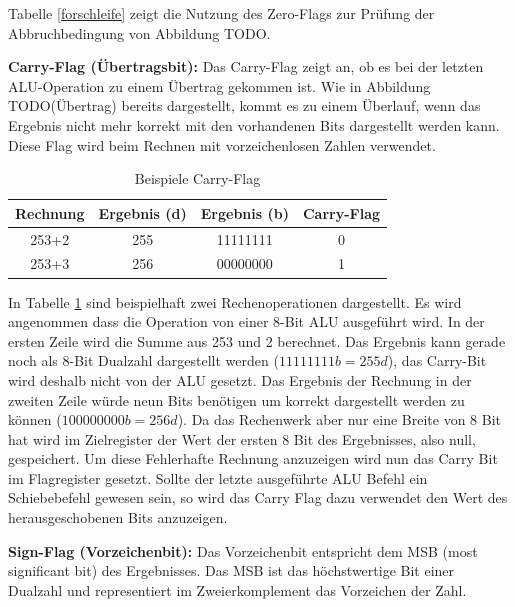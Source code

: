 \documentclass[12pt]{article}
\begin{document}
Tabelle \ref{forschleife} zeigt die Nutzung des Zero-Flags zur Prüfung der Abbruchbedingung von Abbildung TODO.


\noindent \textbf{Carry-Flag (Übertragsbit):} Das Carry-Flag zeigt an, ob es bei der letzten ALU-Operation zu einem Übertrag gekommen ist. Wie in Abbildung TODO(Übertrag) bereits dargestellt, kommt es zu einem Überlauf, wenn das Ergebnis nicht mehr korrekt mit den vorhandenen Bits dargestellt werden kann. Diese Flag wird beim Rechnen mit vorzeichenlosen Zahlen verwendet.

\begin{table}[!htb]
\centering
\begin{tabular}{|c|c|c|c|}
\hline
Rechnung & Ergebnis (d) & Ergebnis (b) & Carry-Flag \\ \hline \hline
253+2    & 255          & 11111111     & 0          \\ \hline \hline
253+3    & 256          & 00000000     & 1          \\ \hline
\end{tabular}
\caption{Beispiele Carry-Flag}
\label{tab:carry}

\end{table}
In Tabelle \ref{tab:carry} sind beispielhaft zwei Rechenoperationen dargestellt. Es wird angenommen dass die Operation von einer 8-Bit ALU ausgeführt wird. In der ersten Zeile wird die Summe aus 253 und 2 berechnet. Das Ergebnis kann gerade noch als 8-Bit Dualzahl dargestellt werden ($11111111b = 255d$), das Carry-Bit wird deshalb nicht von der ALU gesetzt. Das Ergebnis der Rechnung in der zweiten Zeile  würde neun Bits benötigen um korrekt dargestellt werden zu können ($100000000b = 256d$). Da das Rechenwerk aber nur eine Breite von 8 Bit hat wird im Zielregister der Wert der ersten 8 Bit des Ergebnisses, also null, gespeichert. Um diese Fehlerhafte Rechnung anzuzeigen wird nun das Carry Bit im Flagregister gesetzt.  
Sollte der letzte ausgeführte ALU Befehl ein Schiebebefehl gewesen sein, so wird das Carry Flag dazu verwendet den Wert des herausgeschobenen Bits anzuzeigen.


\noindent \textbf{Sign-Flag (Vorzeichenbit):} Das Vorzeichenbit entspricht dem MSB (most significant bit) des Ergebnisses. Das MSB ist das höchstwertige Bit einer Dualzahl und representiert im Zweierkomplement das Vorzeichen der Zahl.
\end{document}
